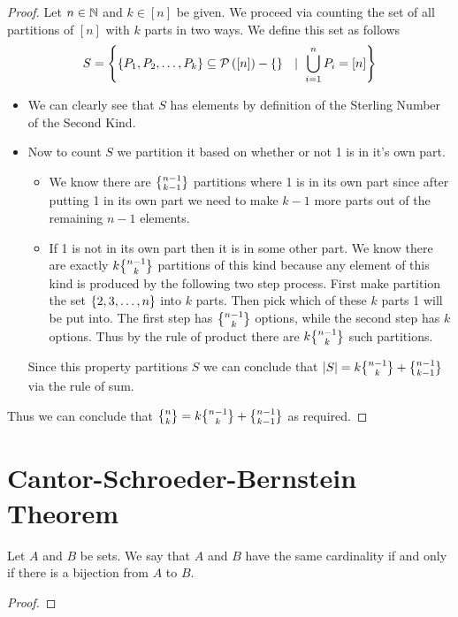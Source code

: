         \begin{proof}
            Let $n \in \mathbb{N}$ and $k \in [n]$ be given.
            We proceed via counting the set of all partitions of $[n]$ with $k$ parts
            in two ways. We define this set as follows
            \[
                S = \left\{\left\{P_1, P_2, \dots, P_k\right\} \subseteq \mathcal{P}\left([n]\right) - \left\{\right\} \  \ \mid \ \displaystyle\bigcup_{i = 1}^{n} P_i = [n]\right\}
            \]
            \begin{itemize}
                \item
                    We can clearly see that $S$ has  elements by definition of
                    the Sterling Number of the Second Kind.
                \item
                    Now to count $S$ we partition it based on whether or not 1 is in
                    it's own part.
                    \begin{itemize}
                        \item
                            We know there are $\npartk{n - 1}{k - 1}$ partitions
                            where 1 is in its own part since after putting 1 in its own part we need
                            to make $k - 1$ more parts out of the remaining $n - 1$ elements.
                        \item
                            If 1 is not in its own part then it is in some other part. We
                            know there are exactly $k \npartk{n - 1}{k}$ partitions of this
                            kind because any element of this kind is produced by the following
                            two step process. First make partition the set $\left\{2, 3, \dots, n\right\}$
                            into $k$ parts. Then pick which of these $k$ parts 1 will be put into.
                            The first step has $\npartk{n - 1}{k}$ options, while the second step
                            has $k$ options. Thus by the rule of product there are $k \npartk{n - 1}{k}$
                            such partitions.
                    \end{itemize}
                    Since this property partitions $S$ we can conclude that
                    $|S| = k \npartk{n - 1}{k} + \npartk{n - 1}{k - 1}$ via the rule of sum.
            \end{itemize}
            Thus we can conclude that $\npartk{n}{k} = k \npartk{n - 1}{k} + \npartk{n - 1}{k - 1}$
            as required. \QED
        \end{proof}
    \section{Cantor-Schroeder-Bernstein Theorem}
        \begin{definition}
            Let $A$ and $B$ be sets. We say that $A$ and $B$ have the same cardinality if and
            only if there is a bijection from $A$ to $B$.
        \end{definition}
        \begin{theorem}
        \end{theorem}
        \begin{proof}
        \end{proof}
